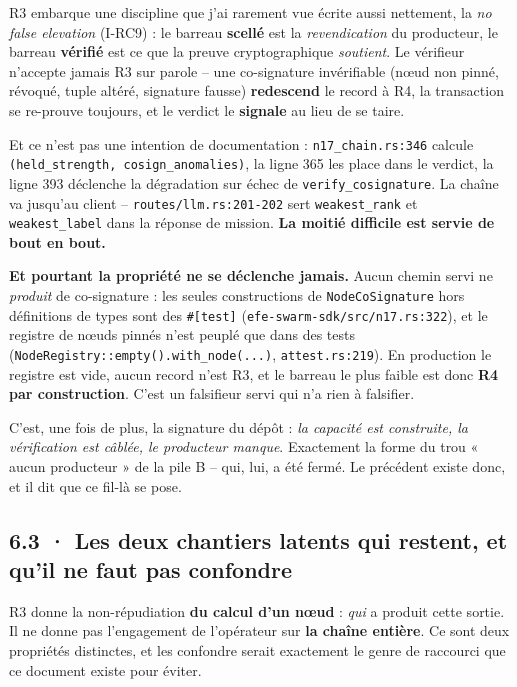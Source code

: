 \documentclass[10pt]{article}
\newcommand{\code}[1]{\texttt{\small #1}}
\begin{document}
R3 embarque une discipline que j'ai rarement vue écrite aussi nettement, la \emph{no false elevation}
(I-RC9) : le barreau \textbf{scellé} est la \emph{revendication} du producteur, le barreau
\textbf{vérifié} est ce que la preuve cryptographique \emph{soutient}. Le vérifieur n'accepte jamais R3
sur parole -- une co-signature invérifiable (n\oe ud non pinné, révoqué, tuple altéré, signature
fausse) \textbf{redescend} le record à R4, la transaction se re-prouve toujours, et le verdict le
\textbf{signale} au lieu de se taire.

Et ce n'est pas une intention de documentation : \code{n17\_chain.rs:346} calcule
\code{(held\_strength, cosign\_anomalies)}, la ligne 365 les place dans le verdict, la ligne 393
déclenche la dégradation sur échec de \code{verify\_cosignature}. La chaîne va jusqu'au client --
\code{routes/llm.rs:201-202} sert \code{weakest\_rank} et \code{weakest\_label} dans la réponse de
mission. \textbf{La moitié difficile est servie de bout en bout.}

\begin{alerte}
\textbf{Et pourtant la propriété ne se déclenche jamais.} Aucun chemin servi ne \emph{produit} de
co-signature : les seules constructions de \code{NodeCoSignature} hors définitions de types sont des
\code{\#[test]} (\code{efe-swarm-sdk/src/n17.rs:322}), et le registre de n\oe uds pinnés n'est peuplé
que dans des tests (\code{NodeRegistry::empty().with\_node(...)}, \code{attest.rs:219}). En production
le registre est vide, aucun record n'est R3, et le barreau le plus faible est donc \textbf{R4 par
construction}. C'est un falsifieur servi qui n'a rien à falsifier.
\end{alerte}

C'est, une fois de plus, la signature du dépôt : \emph{la capacité est construite, la vérification est
câblée, le producteur manque}. Exactement la forme du trou « aucun producteur » de la pile B -- qui,
lui, a été fermé. Le précédent existe donc, et il dit que ce fil-là se pose.

\subsection{6.3 · Les deux chantiers latents qui restent, et qu'il ne faut pas confondre}

R3 donne la non-répudiation \textbf{du calcul d'un n\oe ud} : \emph{qui} a produit cette sortie. Il ne
donne pas l'engagement de l'opérateur sur \textbf{la chaîne entière}. Ce sont deux propriétés
distinctes, et les confondre serait exactement le genre de raccourci que ce document existe pour
éviter.
\end{document}
